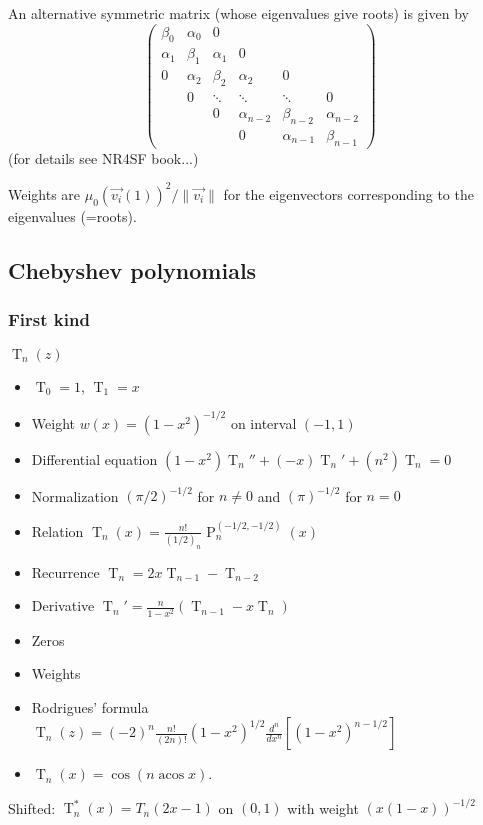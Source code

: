 \documentclass[10pt,dvipdfmx,letterpaper,twoside]{article}
\DeclareMathOperator{\acos}{acos}
\let\O=\operatorname
\let\al=\alpha
\begin{document}
An alternative symmetric matrix (whose eigenvalues give roots) is given by
\[\begin{pmatrix}
\beta_0 & \al_0 &   0 \\
\al_1 & \beta_1 & \al_1 &  0 \\
  0 & \al_2 & \beta_2 & \al_2 &  0 \\
    &  0  & \ddots & \ddots & \ddots & 0\\
    &     &   0 & \al_{n-2} & \beta_{n-2} & \al_{n-2} \\
    &     &     &       0 & \al_{n-1} & \beta_{n-1}
\end{pmatrix}\]
(for details see NR4SF book...)

Weights are $\mu_0(\vec{v_i}(1))^2/\|\vec{v_i}\|$ for the eigenvectors corresponding to the eigenvalues (=roots).

\subsection{Chebyshev polynomials}

\subsubsection{First kind}
$\O{T}_n(z)$
\begin{itemize}
\item $\O{T}_0 = 1$, $\O{T}_1 = x$
\item Weight $w(x) = (1-x^2)^{-1/2}$ on interval $(-1,1)$
\item Differential equation $\left(1-x^2\right) \O{T}_n'' + \left(-x\right) \O{T}_n' + \left(n^2 \right) \O{T}_n = 0$
\item Normalization $(\pi/2)^{-1/2}$ for $n\neq0$ and $(\pi)^{-1/2}$ for $n=0$
\item Relation $\O{T}_n(x) = \frac{n!}{(1/2)_n} \O{P}_n^{(-1/2, -1/2)}(x)$
\item Recurrence $\O{T}_n = 2 x \O{T}_{n-1} - \O{T}_{n-2}$
\item Derivative $\O{T}_n' = \frac{n}{1-x^2}\left( \O{T}_{n-1} - x \O{T}_{n} \right)$
\item Zeros
\item Weights
\item Rodrigues' formula $\O{T}_n(z) = (-2)^n \frac{n!}{(2n)!} (1-x^2)^{1/2} \frac{d^n}{dx^n}\left[ (1-x^2)^{n-1/2} \right]$
\item $\O{T}_n(x) = \cos(n \acos x)$.
\end{itemize}
Shifted: $\O{T}^*_n(x) = T_n(2x-1)$ on $(0,1)$ with weight $(x(1-x))^{-1/2}$
\end{document}
